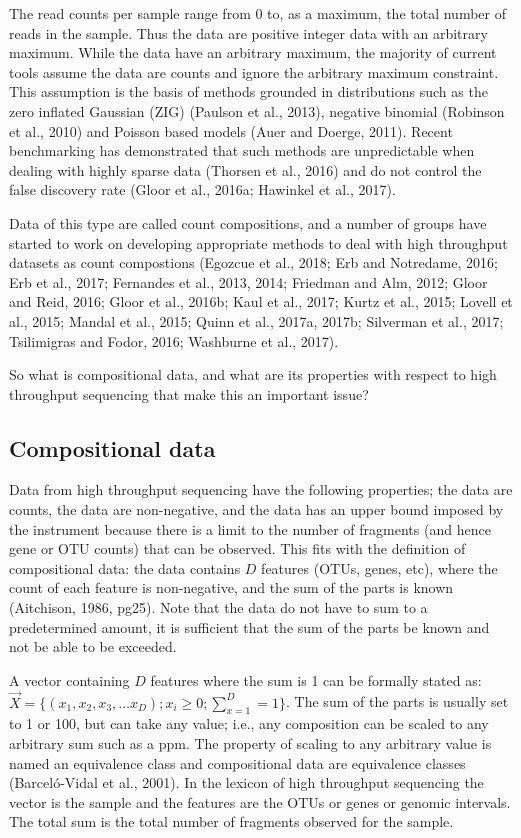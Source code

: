 \documentclass[twocolumn]{article}
\begin{document}
The read counts per sample range from 0 to, as a maximum, the total
number of reads in the sample. Thus the data are positive integer data
with an arbitrary maximum. While the data have an arbitrary maximum, the
majority of current tools assume the data are counts and ignore the
arbitrary maximum constraint. This assumption is the basis of methods
grounded in distributions such as the zero inflated Gaussian (ZIG)
(Paulson et al., 2013), negative binomial (Robinson et al., 2010) and
Poisson based models (Auer and Doerge, 2011). Recent benchmarking has
demonstrated that such methods are unpredictable when dealing with
highly sparse data (Thorsen et al., 2016) and do not control the false
discovery rate (Gloor et al., 2016a; Hawinkel et al., 2017).

Data of this type are called count compositions, and a number of groups
have started to work on developing appropriate methods to deal with high
throughput datasets as count compostions (Egozcue et al., 2018; Erb and
Notredame, 2016; Erb et al., 2017; Fernandes et al., 2013, 2014;
Friedman and Alm, 2012; Gloor and Reid, 2016; Gloor et al., 2016b; Kaul
et al., 2017; Kurtz et al., 2015; Lovell et al., 2015; Mandal et al.,
2015; Quinn et al., 2017a, 2017b; Silverman et al., 2017; Tsilimigras
and Fodor, 2016; Washburne et al., 2017).

So what is compositional data, and what are its properties with respect
to high throughput sequencing that make this an important issue?

\subsection{Compositional data}\label{compositional-data}

Data from high throughput sequencing have the following properties; the
data are counts, the data are non-negative, and the data has an upper
bound imposed by the instrument because there is a limit to the number
of fragments (and hence gene or OTU counts) that can be observed. This
fits with the definition of compositional data: the data contains \(D\)
features (OTUs, genes, etc), where the count of each feature is
non-negative, and the sum of the parts is known (Aitchison, 1986, pg25).
Note that the data do not have to sum to a predetermined amount, it is
sufficient that the sum of the parts be known and not be able to be
exceeded.

A vector containing \(D\) features where the sum is 1 can be formally
stated as:
\(\vec{X} = \{(x_1,x_2,x_3, \ldots x_D); x_i\ge 0; \sum_{x=1}^{D} = 1\}\).
The sum of the parts is usually set to 1 or 100, but can take any value;
i.e., any composition can be scaled to any arbitrary sum such as a ppm.
The property of scaling to any arbitrary value is named an equivalence
class and compositional data are equivalence classes (Barceló-Vidal et
al., 2001). In the lexicon of high throughput sequencing the vector is
the sample and the features are the OTUs or genes or genomic intervals.
The total sum is the total number of fragments observed for the sample.
\end{document}
